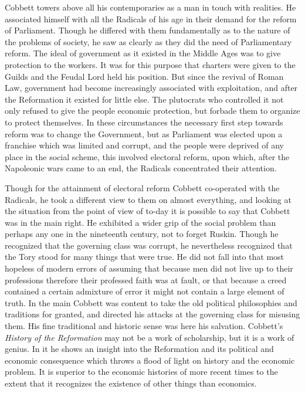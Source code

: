 \documentclass{book}
\begin{document}
Cobbett towers above all his contemporaries as a man in touch with realities. He associated himself with all the Radicals of his age in their demand for the reform of Parliament. Though he differed with them fundamentally as to the nature of the problems of society, he saw as clearly as they did the need of Parliamentary reform. The ideal of government as it existed in the Middle Ages was to give protection to the workers. It was for this purpose that charters were given to the Guilds and the Feudal Lord held his position. But since the revival of Roman Law, government had become increasingly associated with exploitation, and after the Reformation it existed for little else. The plutocrats who controlled it not only refused to give the people economic protection, but forbade them to organize to protect themselves. In these circumstances the necessary first step towards reform was to change the Government, but as Parliament was elected upon a franchise which was limited and corrupt, and the people were deprived of any place in the social scheme, this involved electoral reform, upon which, after the Napoleonic wars came to an end, the Radicals concentrated their attention.

Though for the attainment of electoral reform Cobbett co-operated with the Radicals, he took a different view to them on almost everything, and looking at the situation from the point of view of to-day it is possible to say that Cobbett was in the main right. He exhibited a wider grip of the social problem than perhaps any one in the nineteenth century, not to forget Ruskin. Though he recognized that the governing class was corrupt, he nevertheless recognized that the Tory stood for many things that were true. He did not fall into that most hopeless of modern errors of assuming that because men did not live up to their professions therefore their professed faith was at fault, or that because a creed contained a certain admixture of error it might not contain a large element of truth. In the main Cobbett was content to take the old political philosophies and traditions for granted, and directed his attacks at the governing class for misusing them. His fine traditional and historic sense was here his salvation. Cobbett’s \emph{History of the Reformation} may not be a work of scholarship, but it is a work of genius. In it he shows an insight into the Reformation and its political and economic consequence which throws a flood of light on history and the economic problem. It is superior to the economic histories of more recent times to the extent that it recognizes the existence of other things than economics.
\end{document}
